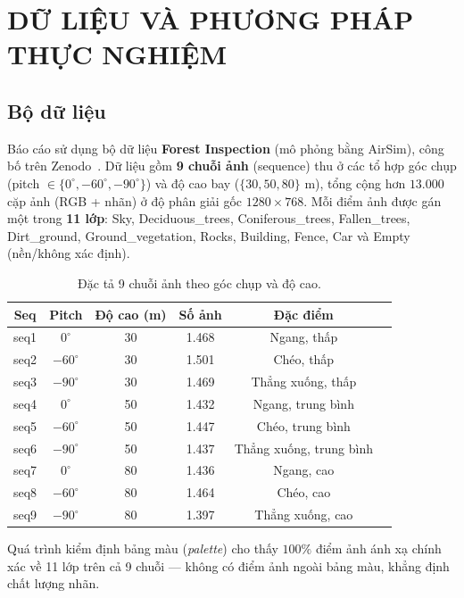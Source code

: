 \chapter{DỮ LIỆU VÀ PHƯƠNG PHÁP THỰC NGHIỆM}
\label{ch:du_lieu}

\section{Bộ dữ liệu}

Báo cáo sử dụng bộ dữ liệu \textbf{Forest Inspection} (mô phỏng bằng AirSim), công bố
trên Zenodo~\cite{forestdataset}. Dữ liệu gồm \textbf{9 chuỗi ảnh} (sequence) thu ở
các tổ hợp góc chụp (pitch $\in\{0^\circ, -60^\circ, -90^\circ\}$) và độ cao bay
($\{30, 50, 80\}$ m), tổng cộng hơn $13.000$ cặp ảnh (RGB + nhãn) ở độ phân giải gốc
$1280\times 768$. Mỗi điểm ảnh được gán một trong \textbf{11 lớp}: Sky,
Deciduous\_trees, Coniferous\_trees, Fallen\_trees, Dirt\_ground, Ground\_vegetation,
Rocks, Building, Fence, Car và Empty (nền/không xác định).

\begin{table}[H]
\centering
\caption{Đặc tả 9 chuỗi ảnh theo góc chụp và độ cao.}
\label{tab:sequences}
\small
\begin{tabular}{c c c c c l}
\toprule
\textbf{Seq} & \textbf{Pitch} & \textbf{Độ cao (m)} & \textbf{Số ảnh} & \textbf{Đặc điểm} \\
\midrule
seq1 & $0^\circ$   & 30 & 1.468 & Ngang, thấp \\
seq2 & $-60^\circ$ & 30 & 1.501 & Chéo, thấp \\
seq3 & $-90^\circ$ & 30 & 1.469 & Thẳng xuống, thấp \\
seq4 & $0^\circ$   & 50 & 1.432 & Ngang, trung bình \\
seq5 & $-60^\circ$ & 50 & 1.447 & Chéo, trung bình \\
seq6 & $-90^\circ$ & 50 & 1.437 & Thẳng xuống, trung bình \\
seq7 & $0^\circ$   & 80 & 1.436 & Ngang, cao \\
seq8 & $-60^\circ$ & 80 & 1.464 & Chéo, cao \\
seq9 & $-90^\circ$ & 80 & 1.397 & Thẳng xuống, cao \\
\bottomrule
\end{tabular}
\end{table}

Quá trình kiểm định bảng màu (\textit{palette}) cho thấy $100\%$ điểm ảnh ánh xạ
chính xác về 11 lớp trên cả 9 chuỗi --- không có điểm ảnh ngoài bảng màu, khẳng định
chất lượng nhãn.

